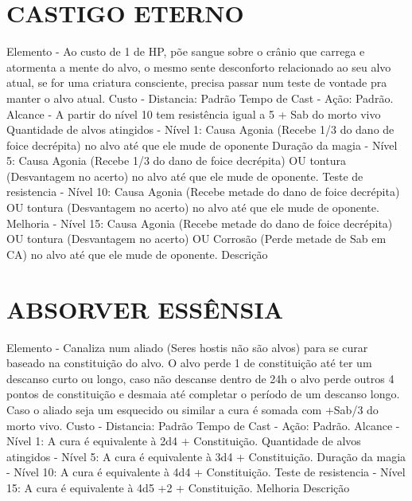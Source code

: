 \documentclass{article}%
\begin{document}
%
\section{CASTIGO ETERNO}%
\label{sec:CASTIGOETERNO}%
Elemento {-}  Ao custo de 1 de HP, põe sangue sobre o crânio que carrega e atormenta a mente do alvo, o mesmo sente desconforto relacionado ao seu alvo atual, se for uma criatura consciente, precisa passar num teste de vontade pra manter o alvo atual.\newline%
Custo {-} Distancia: Padrão\newline%
Tempo de Cast {-} Ação: Padrão.\newline%
Alcance {-} A partir do nível 10 tem resistência igual a 5 + Sab do morto vivo\newline%
Quantidade de alvos atingidos {-} Nível 1: Causa Agonia (Recebe 1/3 do dano de foice decrépita) no alvo até que ele mude de oponente\newline%
Duração da magia {-} Nível 5: Causa Agonia (Recebe 1/3 do dano de foice decrépita) OU tontura (Desvantagem no acerto) no alvo até que ele mude de oponente.\newline%
Teste de resistencia {-} Nível 10: Causa Agonia (Recebe metade do dano de foice decrépita) OU tontura (Desvantagem no acerto) no alvo até que ele mude de oponente.\newline%
Melhoria {-} Nível 15: Causa Agonia (Recebe metade do dano de foice decrépita) OU tontura (Desvantagem no acerto) OU Corrosão (Perde metade de Sab em CA) no alvo até que ele mude de oponente.\newline%
Descrição \newline%

%
\section{ABSORVER ESSÊNSIA}%
\label{sec:ABSORVERESSNSIA}%
Elemento {-}  Canaliza num aliado (Seres hostis não são alvos) para se curar baseado na constituição do alvo. O alvo perde 1 de constituição até ter um descanso curto ou longo, caso não descanse dentro de 24h o alvo perde outros 4 pontos de constituição e desmaia até completar o período de um descanso longo. Caso o aliado seja um esquecido ou similar a cura é somada com +Sab/3 do morto vivo.\newline%
Custo {-} Distancia: Padrão\newline%
Tempo de Cast {-} Ação: Padrão.\newline%
Alcance {-} Nível 1: A cura é equivalente à 2d4 + Constituição.\newline%
Quantidade de alvos atingidos {-} Nível 5: A cura é equivalente à 3d4 + Constituição.\newline%
Duração da magia {-} Nível 10: A cura é equivalente à 4d4 + Constituição.\newline%
Teste de resistencia {-} Nível 15: A cura é equivalente à 4d5 +2 + Constituição.\newline%
Melhoria \newline%
Descrição \newline%
\end{document}
